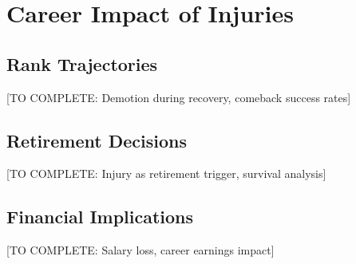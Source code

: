 \section{Career Impact of Injuries}

\subsection{Rank Trajectories}

[TO COMPLETE: Demotion during recovery, comeback success rates]

\subsection{Retirement Decisions}

[TO COMPLETE: Injury as retirement trigger, survival analysis]

\subsection{Financial Implications}

[TO COMPLETE: Salary loss, career earnings impact]